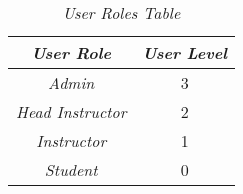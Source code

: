 \begin{table}[H] %
	\centering 
	\caption{\textit{User Roles Table}}
	\label{tab:userrole}
	\begin{tabular}{cc}
		\toprule
		\textit{User Role} & \textit{User Level} \\
		
		\midrule
		\textit{Admin} & 3 \\
		\textit{Head Instructor} & 2 \\
		\textit{Instructor} & 1 \\
		\textit{Student} & 0 \\
		
		\bottomrule
		
	\end{tabular} 
\end{table}

